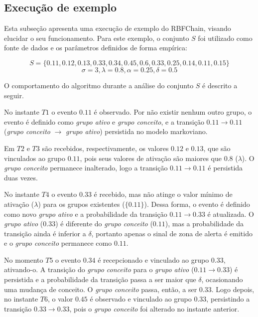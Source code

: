 \documentclass[msc, classic, a4paper]{ufbathesis}
\begin{document}
\subsection{Execução de exemplo}

Esta subseção apresenta uma execução de exemplo do RBFChain, visando elucidar o seu funcionamento.
Para este exemplo, o conjunto $S$ foi utilizado como fonte de dados e os parâmetros definidos de forma empírica:

\[
S = \{0.11, 0.12, 0.13, 0.33, 0.34, 0.45, 0.6, 0.33, 0.25, 0.14, 0.11, 0.15\}
\]
\[
\sigma = 3, \lambda = 0.8, \alpha = 0.25, \delta = 0.5
\]

O comportamento do algoritmo durante a análise do conjunto $S$ é descrito a seguir.

No instante $T1$ o evento $0.11$ é observado.
Por não existir nenhum outro grupo, o evento é definido como \textit{grupo ativo} e \textit{grupo conceito}, e a transição $0.11 \rightarrow 0.11$ (\textit{grupo conceito} $\rightarrow$ \textit{grupo ativo}) persistida no modelo markoviano.

Em $T2$ e $T3$ são recebidos, respectivamente, os valores $0.12$ e $0.13$, que são vinculados ao grupo $0.11$, pois seus valores de ativação são maiores que $0.8$ ($\lambda$). 
O \textit{grupo conceito} permanece inalterado, logo a transição $0.11 \rightarrow 0.11$ é persistida duas vezes.

No instante $T4$ o evento $0.33$ é recebido, mas não atinge o valor mínimo de ativação (\textit{$\lambda$}) para os grupos existentes ($\{0.11\}$).
Dessa forma, o evento é definido como novo \textit{grupo ativo} e a probabilidade da transição $0.11 \longrightarrow 0.33$ é atualizada. 
O \textit{grupo ativo} ($0.33$) é diferente do \textit{grupo conceito} ($0.11$), mas a probabilidade da transição ainda é inferior a $\delta$, portanto apenas o sinal de zona de alerta é emitido e o \textit{grupo conceito} permanece como $0.11$.

No momento $T5$ o evento $0.34$ é recepcionado e vinculado ao grupo $0.33$, ativando-o.
A transição do \textit{grupo conceito} para o \textit{grupo ativo} ($0.11 \rightarrow 0.33$) é persistida e a probabilidade da transição passa a ser maior que $\delta$, ocasionando uma mudança de conceito. O \textit{grupo conceito} passa, então, a ser $0.33$.
Logo depois, no instante $T6$, o valor $0.45$ é observado e vinculado ao grupo $0.33$, persistindo a transição $0.33 \rightarrow 0.33$, pois o \textit{grupo conceito} foi alterado no instante anterior.
\end{document}
